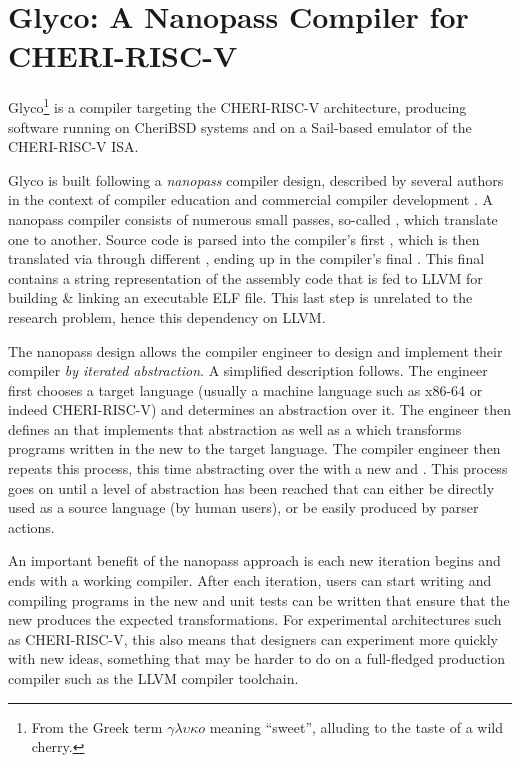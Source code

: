 \documentclass[main.tex]{subfiles}
\begin{document}
\onlyinsubfile{\mainmatter{}}

\chapter{Glyco: A Nanopass Compiler for CHERI-RISC-V}

Glyco\footnote{From the Greek term $\gamma\lambda\upsilon\kappa{}o$ meaning \enquote{sweet}, alluding to the taste of a wild cherry.} is a compiler targeting the CHERI-RISC-V architecture, producing software running on CheriBSD systems and on a Sail-based emulator of the CHERI-RISC-V ISA.

Glyco is built following a \emph{nanopass} compiler design, described by several authors in the context of compiler education \cite{:educomp} and commercial compiler development \cite{:commcomp}. A nanopass compiler consists of numerous small passes, so-called \emph{\nanopasses{}}, which translate one \emph{\il{}} to another. Source code is parsed into the compiler’s first \il{}, which is then translated via \nanopasses{} through different \ils{}, ending up in the compiler's final \il{}. This final \il{} contains a string representation of the assembly code that is fed to LLVM for building \& linking an executable ELF file. This last step is unrelated to the research problem, hence this dependency on LLVM.

The nanopass design allows the compiler engineer to design and implement their compiler \emph{by iterated abstraction}. A simplified description follows. The engineer first chooses a target language (usually a machine language such as x86-64 or indeed CHERI-RISC-V) and determines an abstraction over it. The engineer then defines an \il{} that implements that abstraction as well as a \nanopass{} which transforms programs written in the new \il{} to the target language. The compiler engineer then repeats this process, this time abstracting over the \il{} with a new \il{} and \nanopass{}. This process goes on until a level of abstraction has been reached that can either be directly used as a source language (by human users), or be easily produced by parser actions.

An important benefit of the nanopass approach is each new iteration begins and ends with a working compiler. After each iteration, users can start writing and compiling programs in the new \il{} and unit tests can be written that ensure that the new \nanopass{} produces the expected transformations. For experimental architectures such as CHERI-RISC-V, this also means that designers can experiment more quickly with new ideas, something that may be harder to do on a full-fledged production compiler such as the LLVM compiler toolchain.
\end{document}
